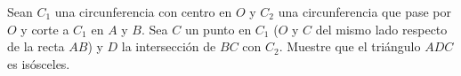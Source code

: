 Sean $C_1$ una circunferencia con centro en $O$ y $C_2$ una circunferencia que pase por $O$ y corte a $C_1$ en $A$ y $B$. Sea $C$ un punto en $C_1$ ($O$ y $C$ del mismo lado respecto de la recta $AB$) y $D$ la intersección de $BC$ con $C_2$. Muestre que el triángulo $ADC$ es isósceles.